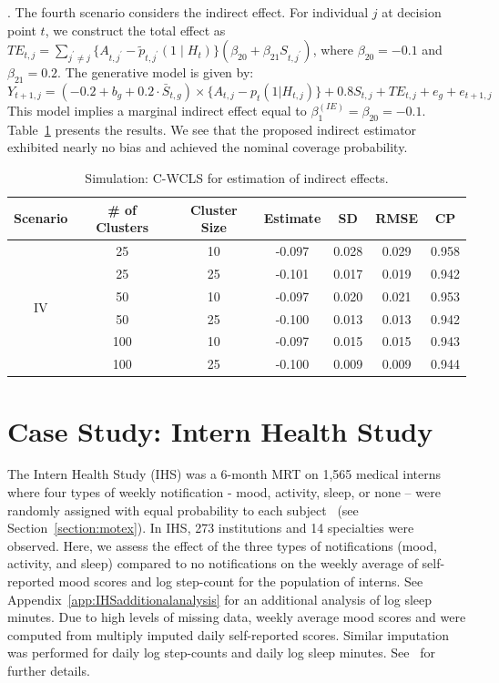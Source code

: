 \documentclass[12pt]{article}
\newcommand{\hs}[3]{\textcolor{red}{[\textit{HS: #1}]}}
\begin{document}

.  The fourth scenario considers the indirect effect.  For individual $j$ at decision point $t$, we construct the total effect as $TE_{t,j} = \sum_{j^\prime \neq j} \{A_{t,j^\prime} - \tilde p_{t, j^\prime} ( 1 \mid H_t) \} (\beta_{20} + \beta_{21} S_{t,j^\prime})$, where $\beta_{20} = -0.1$ and $\beta_{21} = 0.2$. The generative model is given by:
\begin{equation*}
    Y_{t+1,j} = (-0.2 + b_g +  0.2 \cdot \bar S_{t,g}) \times \{A_{t,j} -p_t(1|H_{t,j})\}+ 0.8 S_{t,j} +TE_{t,j} +e_g +e_{t+1,j}
\end{equation*}
This model implies a marginal indirect effect equal to $\beta_1^{(IE)} = \beta_{20} = -0.1$. Table~\ref{tab:simresults_indirect} presents the results.  We see that the proposed indirect estimator exhibited nearly no bias and achieved the nominal coverage probability.

\begin{table}[!th]
\centering
\begin{tabular}{c | cccccc}
\hline
Scenario & \# of Clusters & Cluster Size & Estimate & SD & RMSE & CP \\ \hline
\multirow{6}{*}{IV} & 25 & 10 & -0.097 & 0.028 & 0.029 & 0.958 \\
& 25 & 25 & -0.101 & 0.017 &  0.019 & 0.942 \\
& 50 & 10 & -0.097 & 0.020 & 0.021 & 0.953 \\
& 50 & 25 & -0.100 & 0.013 & 0.013 & 0.942 \\
& 100 & 10 & -0.097 & 0.015 & 0.015 & 0.943 \\
& 100 & 25 &  -0.100 & 0.009 & 0.009 & 0.944 \\ \hline
\end{tabular}
\caption{Simulation: C-WCLS for estimation of indirect effects.}
\label{tab:simresults_indirect}

\end{table}

\section{Case Study: Intern Health Study}
\label{section:casestudy}

The Intern Health Study (IHS) was a 6-month MRT on 1,565 medical interns where four types of weekly notification - mood, activity, sleep, or none -- were randomly assigned with equal probability to each subject~\cite{Necamp2020} (see Section~\ref{section:motex}).
In IHS,  273 institutions and 14 specialties were observed.   Here, we assess the effect of the three types of notifications (mood, activity, and sleep) compared to no notifications on the weekly average of self-reported mood scores and log step-count  for the population of interns.  See Appendix~\ref{app:IHSadditionalanalysis} for an additional analysis of log sleep minutes.  Due to high levels of missing data, weekly average mood scores and were computed from multiply imputed daily self-reported scores.  Similar imputation was performed for daily log step-counts and daily log sleep minutes. See~\cite{Necamp2020} for further details.
\end{document}
